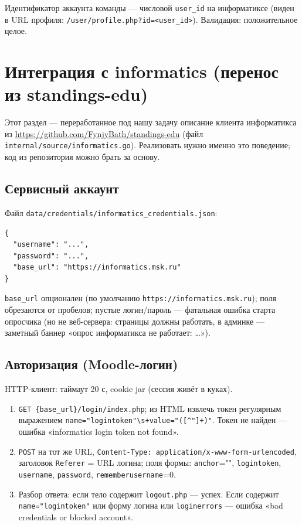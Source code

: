 \documentclass[12pt,a4paper]{article}
\newcommand{\field}[1]{\texttt{#1}}
\begin{document}
Идентификатор аккаунта команды --- числовой \field{user\_id} на
информатиксе (виден в URL профиля:
\field{/user/profile.php?id=<user\_id>}). Валидация: положительное целое.

\section{Интеграция с informatics (перенос из standings-edu)}
\label{sec:informatics}

Этот раздел --- переработанное под нашу задачу описание клиента информатикса
из \url{https://github.com/FynjyBath/standings-edu}
(файл \field{internal/source/informatics.go}). Реализовать нужно именно это
поведение; код из репозитория можно брать за основу.

\subsection{Сервисный аккаунт}

Файл \field{data/credentials/informatics\_credentials.json}:

\begin{small}\begin{verbatim}
{
  "username": "...",
  "password": "...",
  "base_url": "https://informatics.msk.ru"
}
\end{verbatim}\end{small}

\field{base\_url} опционален (по умолчанию \field{https://informatics.msk.ru});
поля обрезаются от пробелов; пустые логин/пароль --- фатальная ошибка старта
опросчика (но не веб-сервера: страницы должны работать, в админке ---
заметный баннер «опрос информатикса не работает: …»).

\subsection{Авторизация (Moodle-логин)}
\label{sec:login}

HTTP-клиент: таймаут 20 с, cookie jar (сессия живёт в куках).

\begin{enumerate}[nosep]
  \item \field{GET \{base\_url\}/login/index.php}; из HTML извлечь токен
        регулярным выражением
        \verb|name="logintoken"\s+value="([^"]+)"|.
        Токен не найден --- ошибка «informatics login token not found».
  \item \field{POST} на тот же URL,
        \field{Content-Type: application/x-www-form-urlencoded},
        заголовок \field{Referer} = URL логина; поля формы:
        \field{anchor}="", \field{logintoken}, \field{username},
        \field{password}, \field{rememberusername}=0.
  \item Разбор ответа: если тело содержит \field{logout.php} --- успех.
        Если содержит \verb|name="logintoken"| или форму логина или
        \field{loginerrors} --- ошибка «bad credentials or blocked account».
\end{enumerate}
\end{document}

